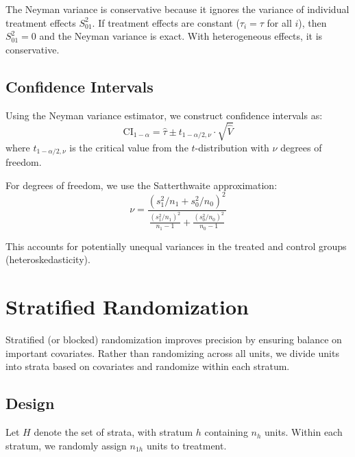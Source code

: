 \begin{insight}
The Neyman variance is conservative because it ignores the variance of individual treatment effects $S_{01}^2$. If treatment effects are constant ($\tau_i = \tau$ for all $i$), then $S_{01}^2 = 0$ and the Neyman variance is exact. With heterogeneous effects, it is conservative.
\end{insight}

\subsection{Confidence Intervals}

Using the Neyman variance estimator, we construct confidence intervals as:
\begin{equation}
\text{CI}_{1-\alpha} = \hat{\tau} \pm t_{1-\alpha/2, \nu} \cdot \sqrt{\hat{V}}
\label{eq:ci}
\end{equation}
where $t_{1-\alpha/2, \nu}$ is the critical value from the $t$-distribution with $\nu$ degrees of freedom.

For degrees of freedom, we use the Satterthwaite approximation:
\begin{equation}
\nu = \frac{(s_1^2/n_1 + s_0^2/n_0)^2}{\frac{(s_1^2/n_1)^2}{n_1 - 1} + \frac{(s_0^2/n_0)^2}{n_0 - 1}}
\label{eq:satterthwaite}
\end{equation}

This accounts for potentially unequal variances in the treated and control groups (heteroskedasticity).


\section{Stratified Randomization}
\label{sec:stratified}

Stratified (or blocked) randomization improves precision by ensuring balance on important covariates. Rather than randomizing across all units, we divide units into strata based on covariates and randomize within each stratum.

\subsection{Design}

Let $H$ denote the set of strata, with stratum $h$ containing $n_h$ units. Within each stratum, we randomly assign $n_{1h}$ units to treatment.

